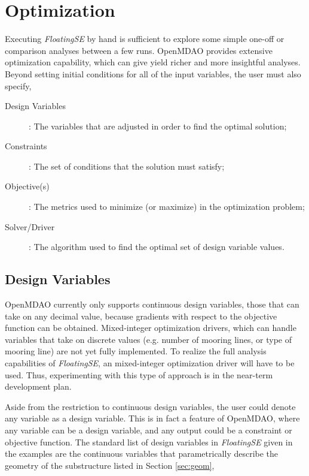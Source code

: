 \chapter{Optimization}
\label{sec:opt}
Executing \textit{FloatingSE} by hand is sufficient to explore some simple
one-off or comparison analyses between a few runs.  OpenMDAO
provides extensive optimization capability, which can give yield richer
and more insightful analyses.  Beyond setting initial conditions for all
of the input variables, the user must also specify,
\begin{description}
\item[Design Variables]: The variables that are adjusted in order to
  find the optimal solution;
\item[Constraints]: The set of conditions that the solution must satisfy;
\item[Objective(s)]: The metrics used to minimize (or maximize) in the
  optimization problem; 
\item[Solver/Driver]: The algorithm used to find the optimal set of
  design variable values.
\end{description}

\section{Design Variables}
OpenMDAO currently only supports continuous design variables, those that
can take on any decimal value, because gradients with respect to the
objective function can be obtained.  Mixed-integer optimization drivers,
which can handle variables that take on discrete values (e.g. number of
mooring lines, or type of mooring line) are not yet fully implemented.
To realize the full analysis capabilities of \textit{FloatingSE}, an
mixed-integer optimization driver will have to be used.  Thus,
experimenting with this type of approach is in the near-term development
plan.

Aside from the restriction to continuous design variables, the user
could denote any variable as a design variable.  This is in fact a
feature of OpenMDAO, where any variable can be a design
variable, and any output could be a constraint or objective function.
The standard list of design variables in \textit{FloatingSE} given in
the examples are the continuous variables that parametrically describe
the geometry of the substructure listed in Section \ref{sec:geom},

